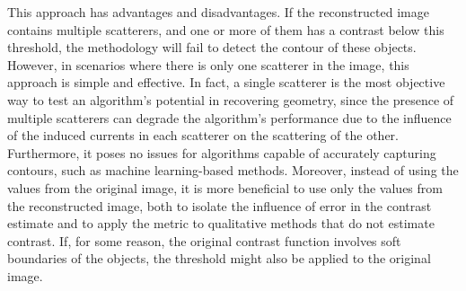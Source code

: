 \documentclass{IEEEtran}
\begin{document}
			This approach has advantages and disadvantages. If the reconstructed image contains multiple scatterers, and one or more of them has a contrast below this threshold, the methodology will fail to detect the contour of these objects. However, in scenarios where there is only one scatterer in the image, this approach is simple and effective. In fact, a single scatterer is the most objective way to test an algorithm's potential in recovering geometry, since the presence of multiple scatterers can degrade the algorithm's performance due to the influence of the induced currents in each scatterer on the scattering of the other. Furthermore, it poses no issues for algorithms capable of accurately capturing contours, such as machine learning-based methods. Moreover, instead of using the values from the original image, it is more beneficial to use only the values from the reconstructed image, both to isolate the influence of error in the contrast estimate and to apply the metric to qualitative methods that do not estimate contrast. If, for some reason, the original contrast function involves soft boundaries of the objects, the threshold might also be applied to the original image.
			
			
\end{document}

